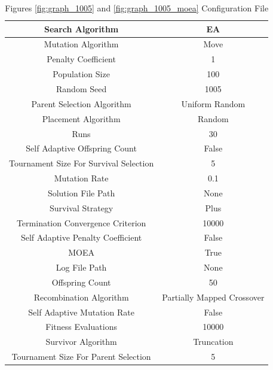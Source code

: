\documentclass{standalone}
\begin{document}
\begin{table}[!htb]
	\centering
	\caption{Figures \ref{fig:graph_1005} and \ref{fig:graph_1005_moea} Configuration File}
	\label{tab:graph_1005}
	\begin{tabular}{| c | c |}
		\hline
		Search Algorithm		& EA		 \\
		\hline
		Mutation Algorithm		& Move		 \\
		\hline
		Penalty Coefficient		& 1		 \\
		\hline
		Population Size		& 100		 \\
		\hline
		Random Seed		& 1005		 \\
		\hline
		Parent Selection Algorithm		& Uniform Random		 \\
		\hline
		Placement Algorithm		& Random		 \\
		\hline
		Runs		& 30		 \\
		\hline
		Self Adaptive Offspring Count		& False		 \\
		\hline
		Tournament Size For Survival Selection		& 5		 \\
		\hline
		Mutation Rate		& 0.1		 \\
		\hline
		Solution File Path		& None		 \\
		\hline
		Survival Strategy		& Plus		 \\
		\hline
		Termination Convergence Criterion		& 10000		 \\
		\hline
		Self Adaptive Penalty Coefficient		& False		 \\
		\hline
		MOEA		& True		 \\
		\hline
		Log File Path		& None		 \\
		\hline
		Offspring Count		& 50		 \\
		\hline
		Recombination Algorithm		& Partially Mapped Crossover		 \\
		\hline
		Self Adaptive Mutation Rate		& False		 \\
		\hline
		Fitness Evaluations		& 10000		 \\
		\hline
		Survivor Algorithm		& Truncation		 \\
		\hline
		Tournament Size For Parent Selection		& 5		 \\
		\hline
	\end{tabular}
\end{table}
\end{document}
